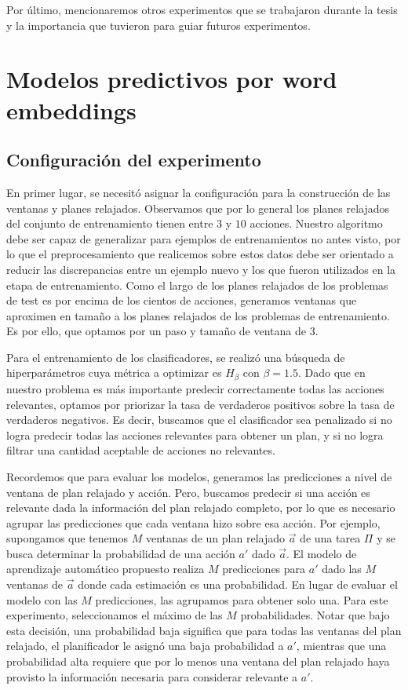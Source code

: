Por último, mencionaremos otros experimentos que se trabajaron durante la tesis
y la importancia que tuvieron para guiar futuros experimentos.

\section{Modelos predictivos por word embeddings}
\label{exp:ad-hoc}

\subsection{Configuración del experimento}

En primer lugar, se necesitó asignar la configuración para la construcción de
las ventanas y planes relajados.  Observamos que por lo general los planes
relajados del conjunto de entrenamiento tienen entre $3$ y $10$ acciones.
Nuestro algoritmo debe ser capaz de generalizar para ejemplos de entrenamientos
no antes visto, por lo que el preprocesamiento que realicemos sobre estos datos
debe ser orientado a reducir las discrepancias entre un ejemplo nuevo y los que
fueron utilizados en la etapa de entrenamiento. Como el largo de los planes
relajados de los problemas de test es por encima de los cientos de acciones,
generamos ventanas que aproximen en tamaño a los planes relajados de los
problemas de entrenamiento. Es por ello, que optamos por un paso y tamaño de
ventana de $3$.

Para el entrenamiento de los clasificadores, se realizó una búsqueda de
hiperparámetros cuya métrica a optimizar es $H_{\beta}$ con $\beta = 1.5$. Dado
que en nuestro problema es más importante predecir correctamente todas las
acciones relevantes, optamos por priorizar la tasa de verdaderos positivos sobre
la tasa de verdaderos negativos. Es decir, buscamos que el clasificador sea
penalizado si no logra predecir todas las acciones relevantes para obtener un
plan, y si no logra filtrar una cantidad aceptable de acciones no relevantes.

Recordemos que para evaluar los modelos, generamos las predicciones a nivel de
ventana de plan relajado y acción. Pero, buscamos predecir si una acción
es relevante dada la información del plan relajado completo, por lo que es
necesario agrupar las predicciones que cada ventana hizo sobre esa acción.
Por ejemplo, supongamos que tenemos $M$ ventanas de un plan relajado $\vec{a}$
de una tarea $\Pi$ y se busca determinar la probabilidad de una acción $a'$ dado
$\vec{a}$. El modelo de aprendizaje automático propuesto realiza $M$
predicciones para $a'$ dado las $M$ ventanas de $\vec{a}$ donde cada estimación
es una probabilidad. En lugar de evaluar el modelo con las $M$ predicciones, las
agrupamos para obtener solo una. Para este experimento, seleccionamos el máximo
de las $M$ probabilidades. Notar que bajo esta decisión, una probabilidad baja
significa que para todas las ventanas del plan relajado, el planificador le
asignó una baja probabilidad a $a'$, mientras que una probabilidad alta requiere
que por lo menos una ventana del plan relajado haya provisto la información
necesaria para considerar relevante a $a'$.

